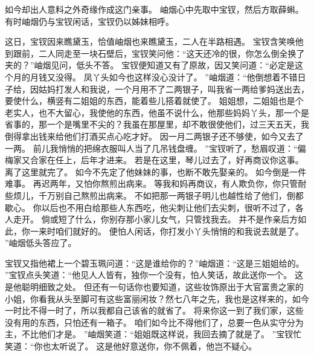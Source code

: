 如今却出人意料之外奇缘作成这门亲事。
岫烟心中先取中宝钗，然后方取薛蝌。
有时岫烟仍与宝钗闲话，宝钗仍以姊妹相呼。
\par
这日，宝钗因来瞧黛玉，恰值岫烟也来瞧黛玉，二人在半路相遇。
宝钗含笑唤他到跟前，二人同走至一块石壁后，宝钗笑问他：“这天还冷的很，你怎么倒全换了夹的？”岫烟见问，低头不答。
宝钗便知道又有了原故，因又笑问道：“必定是这个月的月钱又没得。
凤丫头如今也这样没心没计了。
”岫烟道：“他倒想着不错日子给，因姑妈打发人和我说，一个月用不了二两银子，叫我省一两给爹妈送出去，要使什么，横竖有二姐姐的东西，能着些儿搭着就使了。
姐姐想，二姐姐也是个老实人，也不大留心，我使他的东西，他虽不说什么，他那些妈妈丫头，那一个是省事的，那一个是嘴里不尖的？我虽在那屋里，却不敢很使他们，过三天五天，我倒得拿出钱来给他们打酒买点心吃才好。
因一月二两银子还不够使，如今又去了一两。
前儿我悄悄的把绵衣服叫人当了几吊钱盘缠。
”宝钗听了，愁眉叹道：“偏梅家又合家在任上，后年才进来。
若是在这里，琴儿过去了，好再商议你这事。
离了这里就完了。
如今不先定了他妹妹的事，也断不敢先娶亲的。
如今倒是一件难事。
再迟两年，又怕你熬煎出病来。
等我和妈再商议，有人欺负你，你只管耐些烦儿，千万别自己熬煎出病来。
不如把那一两银子明儿也越性给了他们，倒都歇心。
你以后也不用白给那些人东西吃，他尖刺让他们去尖刺，很听不过了，各人走开。
倘或短了什么，你别存那小家儿女气，只管找我去。
并不是作亲后方如此，你一来时咱们就好的。
便怕人闲话，你打发小丫头悄悄的和我说去就是了。
”岫烟低头答应了。
\par
宝钗又指他裙上一个碧玉珮问道：“这是谁给你的？”岫烟道：“这是三姐姐给的。
”宝钗点头笑道：“他见人人皆有，独你一个没有，怕人笑话，故此送你一个。
这是他聪明细致之处。
但还有一句话你也要知道，这些妆饰原出于大官富贵之家的小姐，你看我从头至脚可有这些富丽闲妆？然七八年之先，我也是这样来的，如今一时比不得一时了，所以我都自己该省的就省了。
将来你这一到了我们家，这些没有用的东西，只怕还有一箱子。
咱们如今比不得他们了，总要一色从实守分为主，不比他们才是。
”岫烟笑道：“姐姐既这样说，我回去摘了就是了。
”宝钗忙笑道：“你也太听说了。
这是他好意送你，你不佩着，他岂不疑心。
